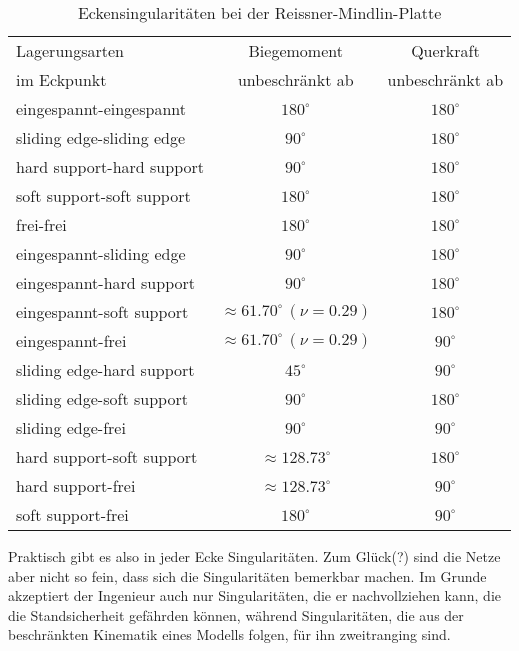 \renewcommand{\arraystretch}{1.2} %
\begin{table}\caption{{\small Eckensingularit\"{a}ten bei der Reissner-Mindlin-Platte}}\label{roessletab}
\vspace{0.2cm}
\begin{center}
\begin{tabular}{| l || c | c |}
\hline
Lagerungsarten & Biegemoment & Querkraft \\
im Eckpunkt & unbeschr\"{a}nkt ab & unbeschr\"{a}nkt ab \\\hline\hline
eingespannt-eingespannt & $180^\circ$ & $180^\circ$ \\
sliding edge-sliding edge & $90^\circ$ & $180^\circ$ \\
hard support-hard support & $90^\circ$ & $180^\circ$ \\
soft support-soft support & $180^\circ$ & $180^\circ$ \\
frei-frei & $180^\circ$ & $180^\circ$ \\
eingespannt-sliding edge &$90^\circ$ & $180^\circ$ \\
eingespannt-hard support & $90^\circ$ & $180^\circ$ \\
eingespannt-soft support & $\approx 61.70^\circ\,(\nu = 0.29)$ & $180^\circ$ \\
eingespannt-frei & $\approx 61.70^\circ\,(\nu = 0.29)$ & $90^\circ$ \\
sliding edge-hard support & $45^\circ$ & $90^\circ$ \\
sliding edge-soft support &  $90^\circ$ & $180^\circ$ \\
sliding edge-frei &  $90^\circ$ & $90^\circ$ \\
hard support-soft support & $\approx 128.73^\circ$ & $180^\circ$ \\
hard support-frei & $\approx 128.73^\circ$ & $90^\circ$ \\
soft support-frei & $180^\circ$ & $90^\circ$ \\ \hline
\end{tabular}
\end{center}
\end{table}\label{SingRM}
\renewcommand{\arraystretch}{1.0}  %

Praktisch gibt es also in jeder Ecke Singularit\"{a}ten. Zum Gl\"{u}ck(?) sind die Netze aber nicht so fein, dass sich die Singularit\"{a}ten bemerkbar machen. Im Grunde akzeptiert der Ingenieur auch nur Singularit\"{a}ten, die er nachvollziehen kann, die die Standsicherheit gef\"{a}hrden k\"{o}nnen, w\"{a}hrend Singularit\"{a}ten, die aus der beschr\"{a}nkten Kinematik eines Modells folgen, f\"{u}r ihn zweitranging sind.

